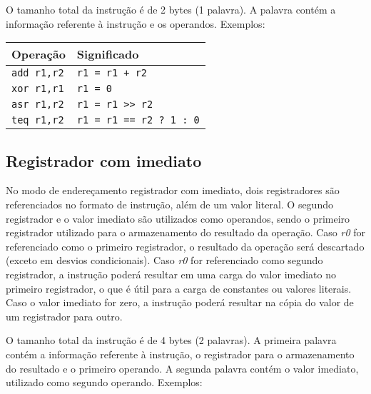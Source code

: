 \documentclass[11pt,a4paper]{report}
\begin{document}
O tamanho total da instrução é de 2 bytes (1 palavra). A palavra contém
a informação referente à instrução e os operandos. Exemplos:

\begin{table}[htb!]
\centering
\begin{tabular}{|p{5.0cm}|p{8.0cm}|}
\hline
\bf{Operação} & \bf{Significado} \\ \hline \hline
\texttt{add r1,r2} & \verb|r1 = r1 + r2| \\ \hline
\texttt{xor r1,r1} & \verb|r1 = 0| \\ \hline
\texttt{asr r1,r2} & \verb|r1 = r1 >> r2| \\ \hline
\texttt{teq r1,r2} & \verb|r1 = r1 == r2 ? 1 : 0| \\ \hline
\end{tabular}
\end{table}

\subsection{Registrador com imediato}

No modo de endereçamento registrador com imediato, dois registradores
são referenciados no formato de instrução, além de um valor literal. O
segundo registrador e o valor imediato são utilizados como operandos, 
sendo o primeiro registrador utilizado para o armazenamento do resultado
da operação. Caso \textit{r0} for referenciado como o primeiro registrador,
o resultado da operação será descartado (exceto em desvios condicionais).
Caso \textit{r0} for referenciado como segundo registrador, a instrução
poderá resultar em uma carga do valor imediato no primeiro registrador,
o que é útil para a carga de constantes ou valores literais. Caso o valor
imediato for zero, a instrução poderá resultar na cópia do valor de um
registrador para outro.

O tamanho total da instrução é de 4 bytes (2 palavras). A primeira 
palavra contém a informação referente à instrução, o registrador para
o armazenamento do resultado e o primeiro operando. A segunda palavra
contém o valor imediato, utilizado como segundo operando. Exemplos:
\end{document}
